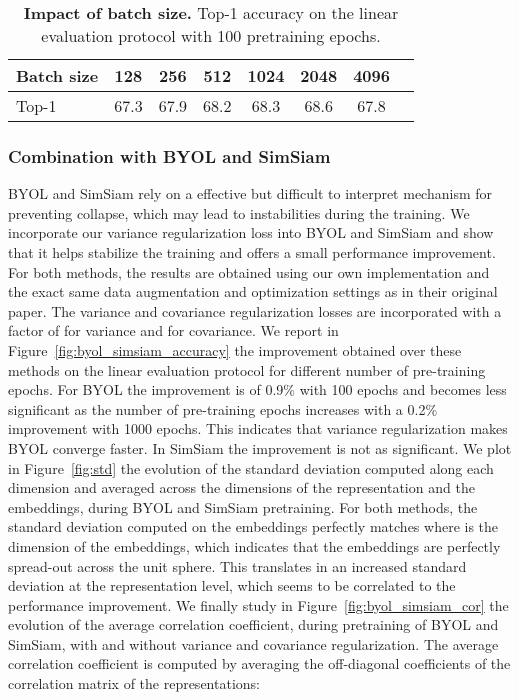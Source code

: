 \documentclass{article}
\begin{document}
\begin{table}[t]
\caption{\textbf{Impact of batch size.} Top-1 accuracy on the linear evaluation protocol with 100 pretraining epochs.}
\label{tab:ablation_bs}
\vspace{-6mm}
\setlength{\tabcolsep}{10.5pt}
\vskip 0.15in
\begin{center}
\begin{tabular}{lccccccc}
\toprule
Batch size      & 128      & 256      & 512      & 1024     & 2048     & 4096 \\
\midrule
Top-1           & 67.3 & 67.9 & 68.2 & 68.3 & 68.6 & 67.8 \\
\bottomrule
\end{tabular}
\end{center}
\vspace{-2mm}
\end{table}


\subsubsection{Combination with BYOL and SimSiam} \label{app:combination}

BYOL \cite{grill2020byol} and SimSiam \cite{chen2020simsiam} rely on a effective but difficult to interpret mechanism for preventing collapse, which may lead to instabilities during the training. We incorporate our variance regularization loss into BYOL and SimSiam and show that it helps stabilize the training and offers a small performance improvement. For both methods, the results are obtained using our own implementation and the exact same data augmentation and optimization settings as in their original paper. The variance and covariance regularization losses are incorporated with a factor of  for variance and  for covariance. We report in Figure~\ref{fig:byol_simsiam_accuracy} the improvement obtained over these methods on the linear evaluation protocol for different number of pre-training epochs. For BYOL the improvement is of 0.9\% with 100 epochs and becomes less significant as the number of pre-training epochs increases with a 0.2\% improvement with 1000 epochs. This indicates that variance regularization makes BYOL converge faster. In SimSiam the improvement is not as significant. We plot in Figure~\ref{fig:std} the evolution of the standard deviation computed along each dimension and averaged across the dimensions of the representation and the embeddings, during BYOL and SimSiam pretraining. For both methods, the standard deviation computed on the embeddings perfectly matches  where  is the dimension of the embeddings, which indicates that the embeddings are perfectly spread-out across the unit sphere. This translates in an increased standard deviation at the representation level, which seems to be correlated to the performance improvement. We finally study in Figure~\ref{fig:byol_simsiam_cor} the evolution of the average correlation coefficient, during pretraining of BYOL and SimSiam, with and without variance and covariance regularization. The average correlation coefficient is computed by averaging the off-diagonal coefficients of the correlation matrix of the representations:
\end{document}
